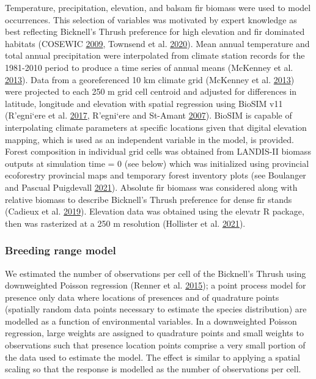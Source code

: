 \documentclass[12pt]{article}
\begin{document}
Temperature, precipitation, elevation, and balsam fir biomass were used
to model occurrences. This selection of variables was motivated by
expert knowledge as best reflecting Bicknell's Thrush preference for
high elevation and fir dominated habitats (COSEWIC
\protect\hyperlink{ref-cosewic_cosewic_2009}{2009}, Townsend et al.
\protect\hyperlink{ref-billerman_bicknells_2020}{2020}). Mean annual
temperature and total annual precipitation were interpolated from
climate station records for the 1981-2010 period to produce a time
series of annual means (McKenney et al.
\protect\hyperlink{ref-mckenney_spatial_2013}{2013}). Data from a
georeferenced 10 km climate grid (McKenney et al.
\protect\hyperlink{ref-mckenney_spatial_2013}{2013}) were projected to
each 250 m grid cell centroid and adjusted for differences in latitude,
longitude and elevation with spatial regression using BioSIM v11
(R\a'egni\a`ere et al.
\protect\hyperlink{ref-regniere_biosim_2017}{2017}, R\a'egni\a`ere and
St-Amant \protect\hyperlink{ref-regniere_stochastic_2007}{2007}). BioSIM
is capable of interpolating climate parameters at specific locations
given that digital elevation mapping, which is used as an independent
variable in the model, is provided. Forest composition in individual
grid cells was obtained from LANDIS-II biomass outputs at simulation
time = 0 (see below) which was initialized using provincial ecoforestry
provincial maps and temporary forest inventory plots (see Boulanger and
Pascual Puigdevall \protect\hyperlink{ref-boulanger_boreal_2021}{2021}).
Absolute fir biomass was considered along with relative biomass to
describe Bicknell's Thrush preference for dense fir stands (Cadieux et
al. \protect\hyperlink{ref-cadieux_spatially_2019}{2019}). Elevation
data was obtained using the elevatr R package, then was rasterized at a
250 m resolution (Hollister et al.
\protect\hyperlink{ref-hollister_elevatr_2021}{2021}).

\hypertarget{breeding-range-model}{%
\subsubsection{Breeding range model}\label{breeding-range-model}}

We estimated the number of observations per cell of the Bicknell's
Thrush using downweighted Poisson regression (Renner et al.
\protect\hyperlink{ref-renner_point_2015}{2015}); a point process model
for presence only data where locations of presences and of quadrature
points (spatially random data points necessary to estimate the species
distribution) are modelled as a function of environmental variables. In
a downweighted Poisson regression, large weights are assigned to
quadrature points and small weights to observations such that presence
location points comprise a very small portion of the data used to
estimate the model. The effect is similar to applying a spatial scaling
so that the response is modelled as the number of observations per cell.
\end{document}
